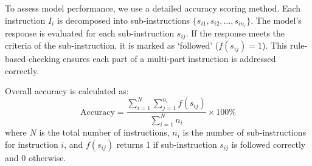     To assess model performance, we use a detailed accuracy scoring method. Each instruction \( I_i \) is decomposed into sub-instructions \( \{s_{i1}, s_{i2}, \ldots, s_{in_i}\} \). The model's response is evaluated for each sub-instruction \( s_{ij} \). If the response meets the criteria of the sub-instruction, it is marked as `followed' (\( f(s_{ij}) = 1 \)). This rule-based checking ensures each part of a multi-part instruction is addressed correctly.

    Overall accuracy is calculated as:
    \begin{equation}
    \text{Accuracy} = \frac{\sum_{i=1}^{N} \sum_{j=1}^{n_i} f(s_{ij})}{\sum_{i=1}^{N} n_i} \times 100\%
    \end{equation}
    where \( N \) is the total number of instructions, \( n_i \) is the number of sub-instructions for instruction \( i \), and \( f(s_{ij}) \) returns 1 if sub-instruction \( s_{ij} \) is followed correctly and 0 otherwise.

